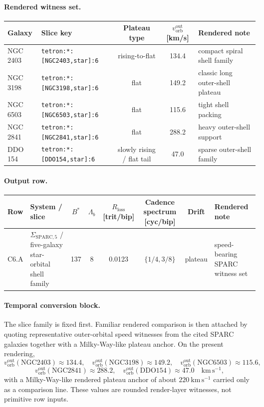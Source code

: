 \paragraph{Rendered witness set.}
\begin{center}
\footnotesize
\begin{tabularx}{\linewidth}{@{}lXc c X@{}}
\toprule
Galaxy & Slice key & Plateau type & $v^{\mathrm{out}}_{\mathrm{orb}}$ [km/s] & Rendered note \\
\midrule
NGC\,2403 & \texttt{tetron:*:[NGC2403,star]:6} & rising-to-flat & 134.4 & compact spiral shell family \\
NGC\,3198 & \texttt{tetron:*:[NGC3198,star]:6} & flat & 149.2 & classic long outer-shell plateau \\
NGC\,6503 & \texttt{tetron:*:[NGC6503,star]:6} & flat & 115.6 & tight shell packing \\
NGC\,2841 & \texttt{tetron:*:[NGC2841,star]:6} & flat & 288.2 & heavy outer-shell support \\
DDO\,154 & \texttt{tetron:*:[DDO154,star]:6} & slowly rising / flat tail & 47.0 & sparse outer-shell family \\
\bottomrule
\end{tabularx}
\end{center}

\paragraph{Output row.}
\begin{center}
\footnotesize
\begin{tabularx}{\linewidth}{@{}lXcccccX@{}}
\toprule
Row & System / slice & $B^*$ & $\Lambda_b$ & $R_{\mathrm{loss}}$ [trit/bip] & Cadence spectrum [cyc/bip] & Drift & Rendered note \\
\midrule
C6.A & $\Sigma_{\mathrm{SPARC},5}$ / five-galaxy star-orbital shell family & 137 & 8 & 0.0123 & $\{1/4,3/8\}$ & plateau & speed-bearing SPARC witness set \\
\bottomrule
\end{tabularx}
\end{center}

\paragraph{Temporal conversion block.} The slice family is fixed first. Familiar rendered comparison is then attached by quoting representative outer-orbital speed witnesses from the cited SPARC galaxies together with a Milky-Way-like plateau anchor. On the present rendering,
\[
v^{\mathrm{out}}_{\mathrm{orb}}(\mathrm{NGC2403})\approx134.4,\quad
v^{\mathrm{out}}_{\mathrm{orb}}(\mathrm{NGC3198})\approx149.2,\quad
v^{\mathrm{out}}_{\mathrm{orb}}(\mathrm{NGC6503})\approx115.6,\]
\[
v^{\mathrm{out}}_{\mathrm{orb}}(\mathrm{NGC2841})\approx288.2,\quad
v^{\mathrm{out}}_{\mathrm{orb}}(\mathrm{DDO154})\approx47.0\quad \mathrm{km\,s^{-1}},
\]
with a Milky-Way-like rendered plateau anchor of about $220\ \mathrm{km\,s^{-1}}$ carried only as a comparison line. These values are rounded render-layer witnesses, not primitive row inputs.

